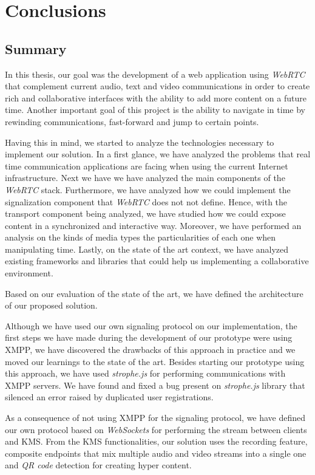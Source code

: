 \chapter{Conclusions}
\label{chapter:conclusion}

\section{Summary}
\label{section:summary}
In this thesis, our goal was the development of a web application using \emph{WebRTC} that complement current audio, text and video communications in order to create rich and collaborative interfaces with the ability to add more content on a future time. Another important goal of this project is the ability to navigate in time by rewinding communications, fast-forward and jump to certain points.

Having this in mind, we started to analyze the technologies necessary to implement our solution. In a first glance, we have analyzed the problems that real time communication applications are facing when using the current Internet infrastructure. Next we have we have analyzed the main components of the \emph{WebRTC} stack. Furthermore, we have analyzed how we could implement the signalization component that \emph{WebRTC} does not not define. Hence, with the transport component being analyzed, we have studied how we could expose content in a synchronized and interactive way. Moreover, we have performed an analysis on the kinds of media types the particularities of each one when manipulating time. Lastly, on the state of the art context, we have analyzed existing frameworks and libraries that could help us implementing a collaborative environment.

Based on our evaluation of the state of the art, we have defined the architecture of our proposed solution.

Although we have used our own signaling protocol on our implementation, the first steps we have made during the development of our prototype were using \ac{XMPP}, we have discovered the drawbacks of this approach in practice and we moved our learnings to the state of the art. Besides starting our prototype using this approach, we have used \emph{strophe.js} for performing communications with \ac{XMPP} servers. We have found and fixed a bug present on \emph{strophe.js} library that silenced an error raised by duplicated user registrations.

As a consequence of not using \ac{XMPP} for the signaling protocol, we have defined our own protocol based on \emph{WebSockets} for performing the stream between clients and \ac{KMS}. From the \ac{KMS} functionalities, our solution uses the recording feature, composite endpoints that mix multiple audio and video streams into a single one and \emph{QR code} detection for creating hyper content.

